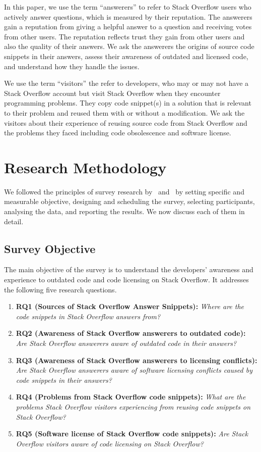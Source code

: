 \documentclass{svjour3}                     %
\begin{document}
In this paper, we use the term ``answerers'' to refer to Stack Overflow users
who actively answer questions, which is measured by their reputation. The
answerers gain a reputation from giving a helpful answer to a question and
receiving votes from other users. The reputation reflects trust they gain from
other users and also the quality of their answers. We ask the answerers the
origins of source code snippets in their answers, assess their awareness of
outdated and licensed code, and understand how they handle the issues.

We use the term ``visitors'' the refer to developers, who may or may not have a
Stack Overflow account but visit Stack Overflow when they encounter programming
problems. They copy code snippet(s) in a solution that is relevant to their
problem and reused them with or without a modification. We ask the visitors
about their experience of reusing source code from Stack Overflow and the
problems they faced including code obsolescence and software license.

\section{Research Methodology}
We followed the principles of survey research by~\cite{Pfleeger2001}
and~\cite{Kitchenham2002} by setting specific and measurable objective,
designing and scheduling the survey, selecting participants, analysing the data,
and reporting the results. We now discuss each of them in detail.

\subsection{Survey Objective}
The main objective of the survey is to understand the developers' awareness and
experience to outdated code and code licensing on Stack Overflow. It addresses
the following five research questions.

\begin{enumerate}
	\item \textbf{RQ1 (Sources of Stack Overflow Answer Snippets):} \textit{Where are the code snippets in Stack Overflow answers from?}
	\item \textbf{RQ2 (Awareness of Stack Overflow answerers to outdated code):} \textit{Are Stack Overflow answerers aware of outdated code in their answers?}
	\item \textbf{RQ3 (Awareness of Stack Overflow answerers to licensing conflicts):} \textit{Are Stack Overflow answerers aware of software licensing
		conflicts caused by code snippets in their answers?}
	\item \textbf{RQ4 (Problems from Stack Overflow code snippets):} \textit{What are the problems Stack Overflow visitors experiencing from reusing code snippets on Stack Overflow?}
	\item \textbf{RQ5 (Software license of Stack Overflow code
            snippets):} \textit{Are Stack Overflow visitors aware of code licensing on Stack Overflow?}
\end{enumerate}
\end{document}

